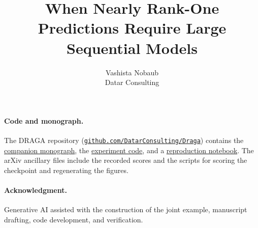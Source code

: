 \documentclass{article}
\title{When Nearly Rank-One Predictions Require Large Sequential Models}
\author{Vashista Nobaub\\Datar Consulting}
\begin{document}
\maketitle

\paragraph{Code and monograph.}
The DRAGA repository (\href{https://github.com/DatarConsulting/Draga}{\nolinkurl{github.com/DatarConsulting/Draga}}) contains the
\href{https://github.com/DatarConsulting/Draga/blob/main/monograph/monograph.pdf}{companion monograph},
the \href{https://github.com/DatarConsulting/Draga/tree/main/experiments}{experiment code},
and a \href{https://github.com/DatarConsulting/Draga/blob/main/notebooks/DRAGA_Reproduce.ipynb}{reproduction notebook}.
The arXiv ancillary files include the recorded scores and the scripts for scoring the checkpoint and regenerating the figures.

\paragraph{Acknowledgment.}
Generative AI assisted with the construction of the joint example, manuscript drafting, code development, and verification.

\clearpage
\appendix

\end{document}
